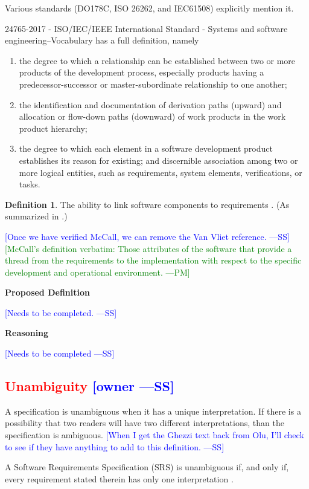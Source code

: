 \documentclass[letterpaper,cleveref]{lipics-v2019}
\newcommand{\authornote}[3]{\textcolor{#1}{[#3 ---#2]}}
\newcommand{\authornote}[3]{}
\newcommand{\wss}[1]{\authornote{blue}{SS}{#1}} %
\newcommand{\pmi}[1]{\authornote{green}{PM}{#1}} %
\newcommand{\notdone}[1]{\textcolor{red}{#1}}
\theoremstyle{definition}
\newtheorem{defn}{Definition}
\begin{document}
Various standards (DO178C, ISO 26262, and IEC61508) explicitly mention it.

24765-2017 - ISO/IEC/IEEE International Standard - Systems and software
engineering--Vocabulary
has a full definition, namely
\begin{enumerate}
\item the degree to which a relationship can be established between two or more
  products of the development process, especially products having a
  predecessor-successor or master-subordinate relationship to one another;
\item the identification and documentation of derivation paths (upward) and
  allocation or flow-down paths (downward) of work products in the work product
  hierarchy;
\item the degree to which each element in a software development product
  establishes its reason for existing; and discernible association among two or
  more logical entities, such as requirements, system elements, verifications,
  or tasks.
\end{enumerate}

\begin{defn}
  The ability to link software components to requirements
  \citep{McCallEtAl1977}. (As summarized in \citet{VanVliet2000}.)
\end{defn} \wss{Once we have verified McCall, we can remove the Van Vliet
  reference.}  \pmi{McCall's definition verbatim: Those attributes of the software that provide a thread from the requirements to the implementation with respect to the specific development and operational environment.}

\noindent \textbf{Proposed Definition} 

\wss{Needs to be completed.}

\noindent \textbf{Reasoning}

\wss{Needs to be completed}

\subsection{\notdone{Unambiguity} \wss{owner}}

A specification is unambiguous when it has a unique interpretation.  If there is
a possibility that two readers will have two different interpretations, than the
specification is ambiguous.  \wss{When I get the Ghezzi text back from Olu, I'll
  check to see if they have anything to add to this definition.}

A Software Requirements Specification (SRS) is unambiguous if, and only if,
every requirement stated therein has only one interpretation \citep{IEEE1998}.
\end{document}
